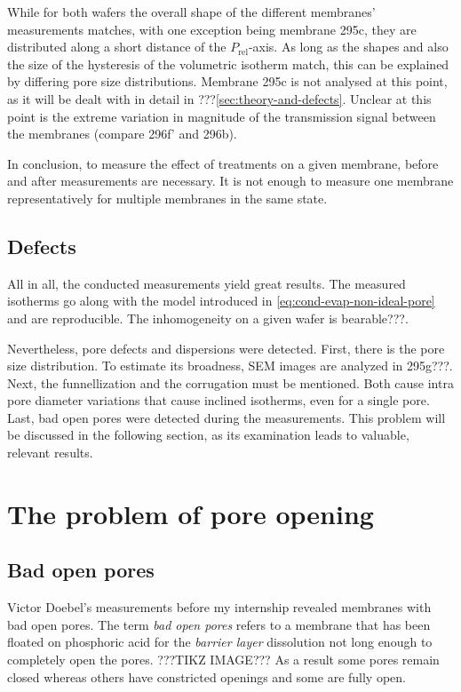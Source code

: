\documentclass[../thesis.tex]{subfiles}
\begin{document}
        While for both wafers the overall shape of the different membranes' measurements matches, with one exception being membrane 295c, they are distributed along a short distance of the $P_\mathrm{rel}$-axis. As long as the shapes and also the size of the hysteresis of the volumetric isotherm match, this can be explained by differing pore size distributions. Membrane 295c is not analysed at this point, as it will be dealt with in detail in ???\cref{sec:theory-and-defects}. Unclear at this point is the extreme variation in magnitude of the transmission signal between the membranes (compare 296f' and 296b).
        \medskip

        In conclusion, to measure the effect of treatments on a given membrane, before and after measurements are necessary. It is not enough to measure one membrane representatively for multiple membranes in the same state.
        


    \subsection{Defects}
    \label{subsec:defects}

        All in all, the conducted measurements yield great results. The measured isotherms go along with the model introduced in \cref{eq:cond-evap-non-ideal-pore} and are reproducible. The inhomogeneity on a given wafer is bearable???.

        Nevertheless, pore defects and dispersions were detected. First, there is the pore size distribution. To estimate its broadness, SEM images are analyzed in 295g???. Next, the funnellization and the corrugation must be mentioned. Both cause intra pore diameter variations that cause inclined isotherms, even for a single pore. Last, bad open pores were detected during the measurements. This problem will be discussed in the following section, as its examination leads to valuable, relevant results.


  \section{The problem of pore opening}
  \label{sec:opening-problem}

      \subsection{Bad open pores}
      \label{subsec:bad-open-pores}

        Victor Doebel's measurements before my internship revealed membranes with bad open pores. The term \textit{bad open pores} refers to a membrane that has been floated on phosphoric acid for the \textit{barrier layer} dissolution not long enough to completely open the pores. ???TIKZ IMAGE??? As a result some pores remain closed whereas others have constricted openings and some are fully open.

        
\end{document}
